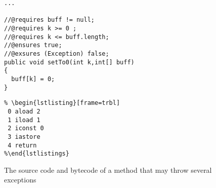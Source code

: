 \begin{figure}
\begin{minipage}[b]{0.5\linewidth}
\begin{verbatim}
...

//@requires buff != null;
//@requires k >= 0 ;
//@requires k <= buff.length;
//@ensures true;
//@exsures (Exception) false;
public void setTo0(int k,int[] buff)
{
  buff[k] = 0;
}
\end{verbatim}
\end{minipage}
\hspace{.5cm}
\begin{minipage}[b]{0.4\linewidth}
\begin{verbatim}
% \begin{lstlisting}[frame=trbl] 
 0 aload 2
 1 iload 1
 2 iconst 0
 3 iastore
 4 return
%\end{lstlistings}
\end{verbatim}
\end{minipage}
\caption{The source code and bytecode of a method that may throw several exceptions}
\label{fig:jmlpreciseex}
\end{figure}
